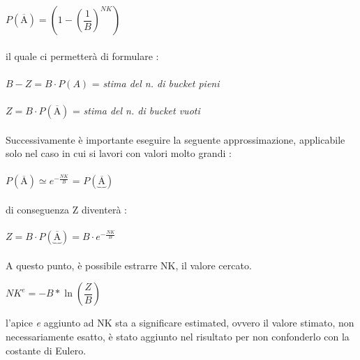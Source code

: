 \documentclass[a4paper,12pt]{article}
\newcommand{\Anegato}{\overline{\text{A}}}
\newcommand{\Amodificato}{\underbrace{\Anegato}}
\begin{document}
	${P(\Anegato) = (1 - (\dfrac{1}{B})^{NK})}$ \\ \\
	il quale ci permetterà di formulare : \\ \\
	${B - Z = B \cdot P(A)}$ = \textit{stima del n. di bucket pieni} \\ \\
	${Z = B \cdot P(\Anegato)}$ = \textit{stima del n. di bucket vuoti} \\ \\
	Successivamente è importante eseguire la seguente approssimazione, applicabile solo nel caso in cui si lavori con valori molto grandi : \\ \\
	${P(\Anegato) \simeq e^{-\tfrac{NK}{B}}}$ = ${P(\Amodificato)}$ \\ \\
	di conseguenza Z diventerà : \\ \\
	${Z = B \cdot P(\Amodificato) = B \cdot e^{-\tfrac{NK}{B}}}$ \\ \\
	A questo punto, è possibile estrarre NK, il valore cercato. \\ 
	\begin{center}
		${NK^{e} = -B*\ln{(\dfrac{Z}{B})}}$  \\ 
	\end{center} 
	l'apice \textit{e} aggiunto ad NK sta a significare estimated, ovvero il valore stimato, non necessariamente esatto, è stato aggiunto nel risultato per non confonderlo con la costante di Eulero. \\
	
\end{document}
